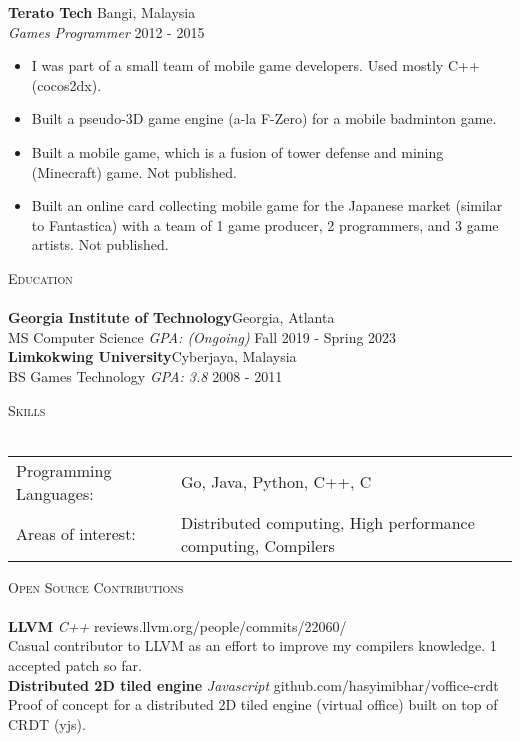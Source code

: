\documentclass[a4paper]{article}
\newcommand{\lineunder} {
    \vspace*{-8pt} \\
    \hspace*{-18pt} \hrulefill \\
}
\newcommand{\header} [1] {
    {\hspace*{-18pt}\vspace*{6pt} \textsc{#1}}
    \vspace*{-6pt} \lineunder
}
\begin{document}
\textbf{Terato Tech} \hfill Bangi, Malaysia\\
\textit{Games Programmer} \hfill 2012 - 2015\\
\vspace{-1mm}
\begin{itemize} \itemsep 1pt
	\item I was part of a small team of mobile game developers. Used mostly C++ (cocos2dx).
	\item Built a pseudo-3D game engine (a-la F-Zero) for a mobile badminton game.
	\item Built a mobile game, which is a fusion of tower defense and mining (Minecraft) game. Not published.
	\item Built an online card collecting mobile game for the Japanese market (similar to Fantastica) with a team of 1 game producer, 2 programmers, and 3 game artists. Not published.
\end{itemize}

\header{Education}
\textbf{Georgia Institute of Technology}\hfill Georgia, Atlanta\\
MS Computer Science \textit{GPA: (Ongoing)} \hfill Fall 2019 - Spring 2023\\
\vspace{2mm}
\textbf{Limkokwing University}\hfill Cyberjaya, Malaysia\\
BS Games Technology \textit{GPA: 3.8} \hfill 2008 - 2011\\
\vspace{2mm}

\header{Skills}
\begin{tabular}{ l l }
	Programming Languages: & Go, Java, Python, C++, C                                     \\
	Areas of interest:     & Distributed computing, High performance computing, Compilers \\
\end{tabular}
\vspace{2mm}

\header{Open Source Contributions}
{\textbf{LLVM}} {\sl C++} \hfill reviews.llvm.org/people/commits/22060/\\
Casual contributor to LLVM as an effort to improve my compilers knowledge. 1 accepted patch so far.\\
\vspace*{2mm}
{\textbf{Distributed 2D tiled engine}} {\sl Javascript} \hfill github.com/hasyimibhar/voffice-crdt\\
Proof of concept for a distributed 2D tiled engine (virtual office) built on top of CRDT (yjs).\\
\vspace*{2mm}
\end{document}
